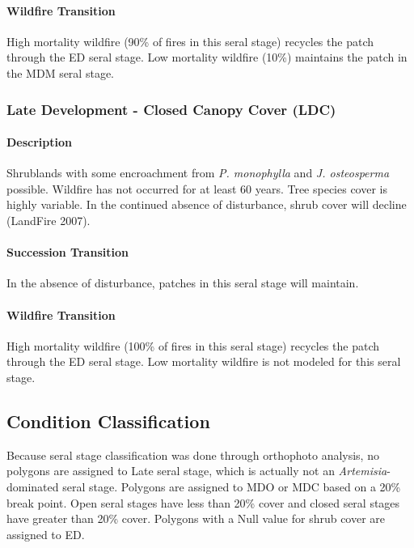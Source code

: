 \paragraph{Wildfire Transition} High mortality wildfire (90\% of fires in this seral stage) recycles the patch through the ED seral stage. Low mortality wildfire (10\%) maintains the patch in the MDM seral stage.

\noindent\hrulefill


\subsubsection{Late Development - Closed Canopy Cover (LDC)}

\paragraph{Description} Shrublands with some encroachment from \emph{P. monophylla} and \emph{J. osteosperma} possible. Wildfire has not occurred for at least 60 years. Tree species cover is highly variable. In the continued absence of disturbance, shrub cover will decline (LandFire 2007).

\paragraph{Succession Transition} In the absence of disturbance, patches in this seral stage will maintain. 

\paragraph{Wildfire Transition} High mortality wildfire (100\% of fires in this seral stage) recycles the patch through the ED seral stage. Low mortality wildfire is not modeled for this seral stage.

\noindent\hrulefill

\subsection*{Condition Classification}
Because seral stage classification was done through orthophoto analysis, no polygons are assigned to Late seral stage, which is actually not an \emph{Artemisia}-dominated seral stage. Polygons are assigned to MDO or MDC based on a 20\% break point. Open seral stages have less than 20\% cover and closed seral stages have greater than 20\% cover. Polygons with a Null value for shrub cover are assigned to ED.


